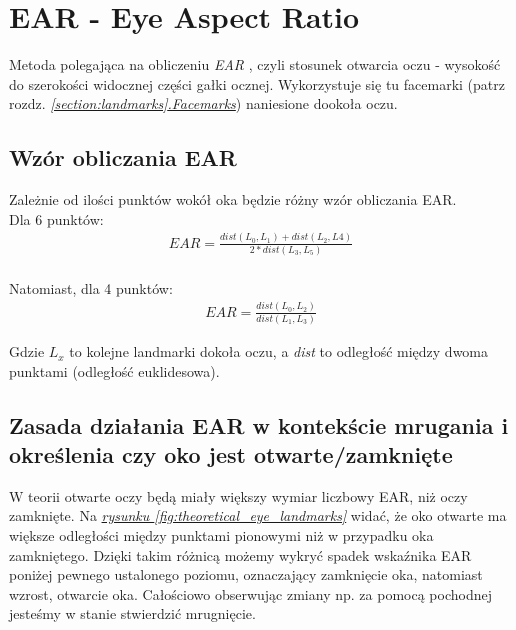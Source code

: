 \newpage

\section{EAR - Eye Aspect Ratio} \label{section:EARsection}

Metoda polegająca na obliczeniu \textit{EAR}  \cite{EARRaspberryPi} \cite{eyeBlinkEARRosebrock}, czyli stosunek otwarcia oczu - wysokość do szerokości widocznej części gałki ocznej. Wykorzystuje się tu facemarki (patrz rozdz. \hyperref[{section:landmarks}]{\textit{\ref{section:landmarks}.Facemarks}}) naniesione dookoła oczu.

\subsection{Wzór obliczania EAR}
Zależnie od ilości punktów wokół oka będzie różny wzór obliczania EAR.\\
Dla 6 punktów:
\begin{align}
    EAR = \frac{dist(L_0, L_1) + dist(L_2, L4)}{2 * dist(L_3, L_5)}
\end{align}
\\
Natomiast, dla 4 punktów:
\begin{align}
    EAR = \frac{dist(L_0, L_2)}{dist(L_1, L_3)}
\end{align}

Gdzie \textit{$L_x$} to kolejne landmarki dokoła oczu, a \textit{dist} to odległość między dwoma punktami (odległość euklidesowa).\\

\subsection{Zasada działania EAR w kontekście mrugania i określenia czy oko jest otwarte/zamknięte}

W teorii otwarte oczy będą miały większy wymiar liczbowy EAR, niż oczy zamknięte. Na \hyperref[{fig:theoretical_eye_landmarks}]{\textit{rysunku \ref{fig:theoretical_eye_landmarks}}} widać, że oko otwarte ma większe odległości między punktami pionowymi niż w przypadku oka zamkniętego. Dzięki takim różnicą możemy wykryć spadek wskaźnika EAR poniżej pewnego ustalonego poziomu, oznaczający zamknięcie oka, natomiast wzrost, otwarcie oka. Całościowo obserwując zmiany np. za pomocą pochodnej jesteśmy w stanie stwierdzić mrugnięcie.

